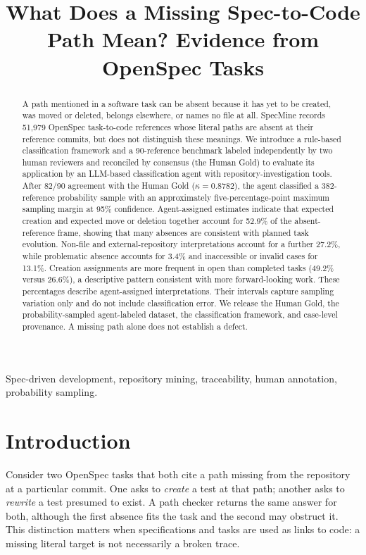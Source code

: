 \documentclass[10pt,conference]{IEEEtran}
\begin{document}
\title{What Does a Missing Spec-to-Code Path Mean? Evidence from OpenSpec Tasks}
\author{}
\maketitle

\begin{abstract}
A path mentioned in a software task can be absent because it has yet to be created, was moved or deleted, belongs elsewhere, or names no file at all. SpecMine records 51,979 OpenSpec task-to-code references whose literal paths are absent at their reference commits, but does not distinguish these meanings. We introduce a rule-based classification framework and a 90-reference benchmark labeled independently by two human reviewers and reconciled by consensus (the Human Gold) to evaluate its application by an LLM-based classification agent with repository-investigation tools. After 82/90 agreement with the Human Gold ($\kappa=0.8782$), the agent classified a 382-reference probability sample with an approximately five-percentage-point maximum sampling margin at 95\% confidence. Agent-assigned estimates indicate that expected creation and expected move or deletion together account for 52.9\% of the absent-reference frame, showing that many absences are consistent with planned task evolution. Non-file and external-repository interpretations account for a further 27.2\%, while problematic absence accounts for 3.4\% and inaccessible or invalid cases for 13.1\%. Creation assignments are more frequent in open than completed tasks (49.2\% versus 26.6\%), a descriptive pattern consistent with more forward-looking work. These percentages describe agent-assigned interpretations. Their intervals capture sampling variation only and do not include classification error. We release the Human Gold, the probability-sampled agent-labeled dataset, the classification framework, and case-level provenance. A missing path alone does not establish a defect.
\end{abstract}
\begin{IEEEkeywords}
Spec-driven development, repository mining, traceability, human annotation, probability sampling.
\end{IEEEkeywords}

\section{Introduction}
Consider two OpenSpec tasks that both cite a path missing from the repository at a particular commit. One asks to \emph{create} a test at that path; another asks to \emph{rewrite} a test presumed to exist. A path checker returns the same answer for both, although the first absence fits the task and the second may obstruct it. This distinction matters when specifications and tasks are used as links to code: a missing literal target is not necessarily a broken trace.
\end{document}
